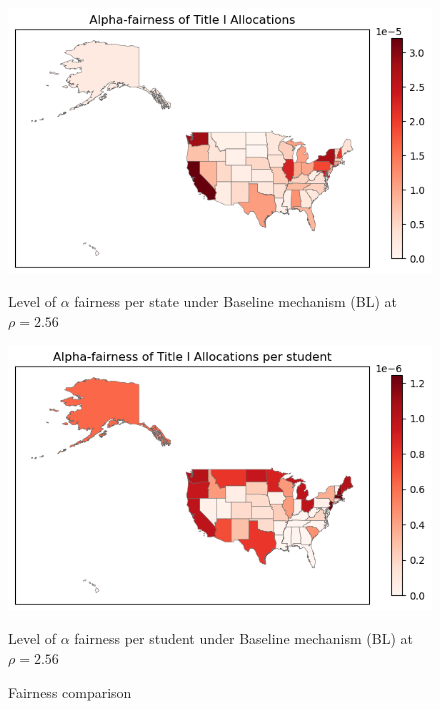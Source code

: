 \documentclass[9pt,lineno,twocolumn,twoside]{pnas-new}
\begin{document}
    \begin{figure}[h]
        \centering
        \begin{minipage}[b]{0.45\linewidth}
            \centering
            \includegraphics[width=\linewidth]{images/af_by_state.png}
            \caption{Level of $\alpha$ fairness per state under Baseline mechanism (BL) at $\rho = 2.56$}
            \label{fig:state_alpha}
        \end{minipage}
        \hfill
        \begin{minipage}[b]{0.45\linewidth}
            \centering
            \includegraphics[width=\linewidth]{images/af_by_student.png}
            \caption{Level of $\alpha$ fairness per student under Baseline mechanism (BL) at $\rho = 2.56$}
            \label{fig:student_alpha}
        \end{minipage}
        \caption{Fairness comparison}
        \label{fig:fairness_comparison}
    \end{figure}
\end{document}
